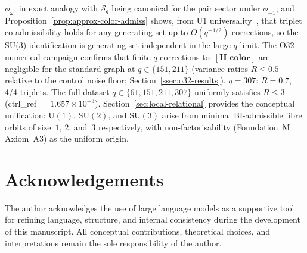 \documentclass[11pt,a4paper]{article}
\theoremstyle{definition}
\theoremstyle{remark}
\newcommand{\SU}{\mathrm{SU}}
\newcommand{\Hcolor}{\mathbf{[H\text{-}color]}}
\newcommand{\Sq}{\mathcal{S}_q}
\begin{document}
    $\phi_\omega$, in exact analogy with $\Sq$ being canonical for the pair sector under
    $\phi_{-1}$; and Proposition~\ref{prop:approx-color-admiss} shows, from U1
    universality~\cite{Beau2026u1}, that triplet co-admissibility holds for any generating set
    up to $O(q^{-1/2})$ corrections, so the SU(3) identification is generating-set-independent
    in the large-$q$ limit.
    The O32 numerical campaign confirms that finite-$q$ corrections to~$\Hcolor$ are
    negligible for the standard graph at $q \in \{151, 211\}$ (variance ratios $R \leq 0.5$
    relative to the control noise floor; Section~\ref{ssec:o32-results}).
    $q=307$: $R=0.7$, 4/4 triplets. The full dataset $q\in\{61,151,211,307\}$
    uniformly satisfies $R\leq 3$ (ctrl\_ref $=1.657\times10^{-3}$).
    Section~\ref{sec:local-relational} provides the conceptual unification: $\mathrm{U}(1)$,
    $\SU(2)$, and $\SU(3)$ arise from minimal BI-admissible fibre orbits of size~$1$, $2$, and~$3$
    respectively, with non-factorisability (Foundation~M Axiom~A3) as the uniform origin.

    \newpage
  \section*{Acknowledgements}
    The author acknowledges the use of large language models as a supportive tool for refining
    language, structure, and internal consistency during the development of this manuscript.
    All conceptual contributions, theoretical choices, and interpretations remain the sole
    responsibility of the author.

    
    
\end{document}
